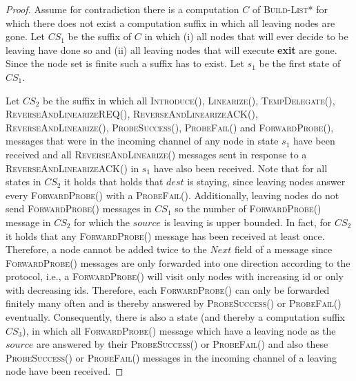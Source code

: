 \documentclass[a4paper,USenglish]{lipics}
\newcommand{\blpp}{\textsc{Build-List*}\xspace}
\newcommand{\linearize}[1]{\textsc{Linearize(\ensuremath{#1})}\xspace}
\newcommand{\introduce}[1]{\textsc{Introduce(\ensuremath{#1})}\xspace}
\newcommand{\tempdelegate}[1]{\textsc{TempDelegate(\ensuremath{#1})}\xspace}
\newcommand{\forwardprobe}[1]{\textsc{ForwardProbe(\ensuremath{#1})}\xspace}
\newcommand{\psuccess}[1]{\textsc{ProbeSuccess(\ensuremath{#1})}\xspace}
\newcommand{\pfail}[1]{\textsc{ProbeFail(\ensuremath{#1})}\xspace}
\newcommand{\revandlin}[1]{\textsc{ReverseAndLinearize(\ensuremath{#1})}\xspace} \newcommand{\revandlinREQ}[1]{\textsc{ReverseAndLinearizeREQ(#1)}\xspace}
\newcommand{\revandlinACK}[1]{\textsc{ReverseAndLinearizeACK(#1)}\xspace}
\begin{document}
 \begin{proof}
   Assume for contradiction there is a computation $C$ of \blpp for which there does not exist a computation suffix in which all leaving nodes are gone.
   Let $CS_1$ be the suffix of $C$ in which (i) all nodes that will ever decide to be leaving have done so and (ii) all leaving nodes that will execute \textbf{exit} are gone.
Since the node set is finite such a suffix has to exist.
   Let $s_1$ be the first state of $CS_1$.

  Let $CS_2$ be the suffix in which all \introduce{}, \linearize{}, \tempdelegate{}, \revandlinREQ{}, \revandlinACK{}, \revandlin{}, \psuccess{}, \pfail{} and \forwardprobe{}, messages that were in the incoming channel of any node in state $s_1$ have been received and all \revandlin{} messages sent in response to a \revandlinACK{} in $s_1$ have also been received.
  Note that for all states in $CS_2$ it holds that holds that $dest$ is staying, since leaving nodes answer every \forwardprobe{} with a \pfail{}.
    Additionally, leaving nodes do not send \forwardprobe{} messages in $CS_1$ so the number of  \forwardprobe{} message in $CS_2$ for which the $source$ is leaving is upper bounded.
  In fact, for $CS_2$ it holds that any \forwardprobe{} message has been received at least once.
  Therefore, a node cannot be added twice to the $Next$ field of a message since \forwardprobe{}messages are only forwarded into one direction according to the protocol, i.e., a \forwardprobe{} will visit only nodes with increasing id or only with decreasing ids.
  Therefore, each \forwardprobe{} can only be forwarded finitely many often and is thereby answered by \psuccess{} or \pfail{} eventually.
  Consequently, there is also a state (and thereby a computation suffix $CS_3$), in which all \forwardprobe{} message which have a leaving node as the $source$ are answered by their \psuccess{} or \pfail{} and also these \psuccess{} or \pfail{} messages in the incoming channel of a leaving node have been received. 


\end{proof}
\end{document}
